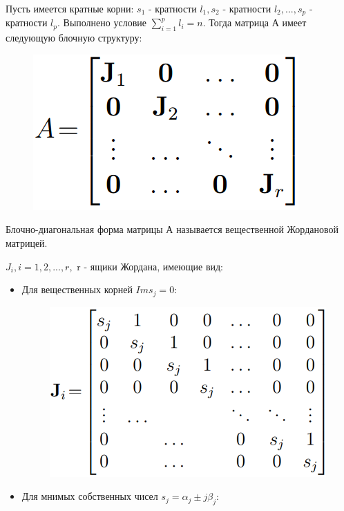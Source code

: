 \documentclass[14pt,a4paper,report]{report}
\begin{document}
\begin{itemize}
	Пусть имеется кратные корни: $s_1$ - кратности $l_1,s_2$ - кратности $l_2,...,s_p$ - кратности $l_p$. Выполнено условие $\sum_{i=1}^{p}l_i=n$. Тогда матрица А имеет следующую блочную структуру:
	
	\begin{figure}[h!]
		\centering
		\includegraphics[scale = 0.50]{images/3.png}
		\label{image:3}
	\end{figure}
	
	Блочно-диагональная форма матрицы А называется вещественной Жордановой матрицей.
	
	$J_i, i=1,2,...,r,$ r - ящики Жордана, имеющие вид: 
	
	\begin{itemize}
		\item Для вещественных корней $Ims_j=0$:
		
		\begin{figure}[h!]
			\centering
			\includegraphics[scale = 0.40]{images/4.png}
			\label{image:4}
		\end{figure}
		
		\item Для мнимых собственных чисел $s_j=\alpha_j\pm j\beta_j$:
		

\end{itemize}
\end{itemize}
\end{document}
